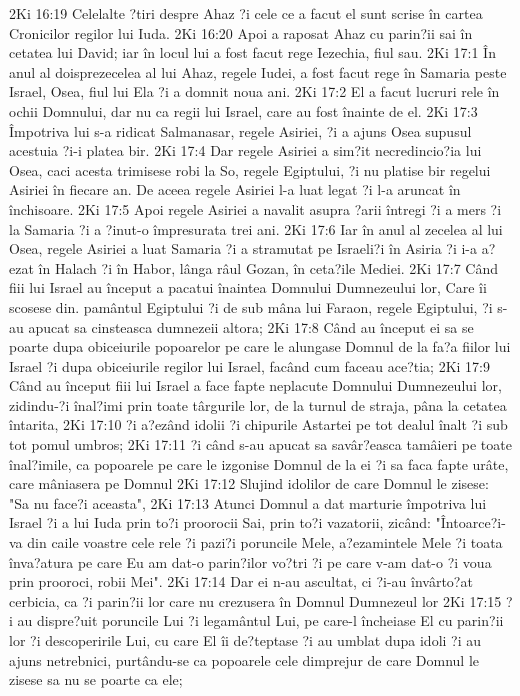 2Ki 16:19  Celelalte ?tiri despre Ahaz ?i cele ce a facut el sunt scrise în cartea Cronicilor regilor lui Iuda.
2Ki 16:20  Apoi a raposat Ahaz cu parin?ii sai în cetatea lui David; iar în locul lui a fost facut rege Iezechia, fiul sau.
2Ki 17:1  În anul al doisprezecelea al lui Ahaz, regele Iudei, a fost facut rege în Samaria peste Israel, Osea, fiul lui Ela ?i a domnit noua ani.
2Ki 17:2  El a facut lucruri rele în ochii Domnului, dar nu ca regii lui Israel, care au fost înainte de el.
2Ki 17:3  Împotriva lui s-a ridicat Salmanasar, regele Asiriei, ?i a ajuns Osea supusul acestuia ?i-i platea bir.
2Ki 17:4  Dar regele Asiriei a sim?it necredincio?ia lui Osea, caci acesta trimisese robi la So, regele Egiptului, ?i nu platise bir regelui Asiriei în fiecare an. De aceea regele Asiriei l-a luat legat ?i l-a aruncat în închisoare.
2Ki 17:5  Apoi regele Asiriei a navalit asupra ?arii întregi ?i a mers ?i la Samaria ?i a ?inut-o împresurata trei ani.
2Ki 17:6  Iar în anul al zecelea al lui Osea, regele Asiriei a luat Samaria ?i a stramutat pe Israeli?i în Asiria ?i i-a a?ezat în Halach ?i în Habor, lânga râul Gozan, în ceta?ile Mediei.
2Ki 17:7  Când fiii lui Israel au început a pacatui înaintea Domnului Dumnezeului lor, Care îi scosese din. pamântul Egiptului ?i de sub mâna lui Faraon, regele Egiptului, ?i s-au apucat sa cinsteasca dumnezeii altora;
2Ki 17:8  Când au început ei sa se poarte dupa obiceiurile popoarelor pe care le alungase Domnul de la fa?a fiilor lui Israel ?i dupa obiceiurile regilor lui Israel, facând cum faceau ace?tia;
2Ki 17:9  Când au început fiii lui Israel a face fapte neplacute Domnului Dumnezeului lor, zidindu-?i înal?imi prin toate târgurile lor, de la turnul de straja, pâna la cetatea întarita,
2Ki 17:10  ?i a?ezând idolii ?i chipurile Astartei pe tot dealul înalt ?i sub tot pomul umbros;
2Ki 17:11  ?i când s-au apucat sa savâr?easca tamâieri pe toate înal?imile, ca popoarele pe care le izgonise Domnul de la ei ?i sa faca fapte urâte, care mâniasera pe Domnul
2Ki 17:12  Slujind idolilor de care Domnul le zisese: "Sa nu face?i aceasta",
2Ki 17:13  Atunci Domnul a dat marturie împotriva lui Israel ?i a lui Iuda prin to?i proorocii Sai, prin to?i vazatorii, zicând: "Întoarce?i-va din caile voastre cele rele ?i pazi?i poruncile Mele, a?ezamintele Mele ?i toata înva?atura pe care Eu am dat-o parin?ilor vo?tri ?i pe care v-am dat-o ?i voua prin prooroci, robii Mei".
2Ki 17:14  Dar ei n-au ascultat, ci ?i-au învârto?at cerbicia, ca ?i parin?ii lor care nu crezusera în Domnul Dumnezeul lor
2Ki 17:15  ?i au dispre?uit poruncile Lui ?i legamântul Lui, pe care-l încheiase El cu parin?ii lor ?i descoperirile Lui, cu care El îi de?teptase ?i au umblat dupa idoli ?i au ajuns netrebnici, purtându-se ca popoarele cele dimprejur de care Domnul le zisese sa nu se poarte ca ele;
